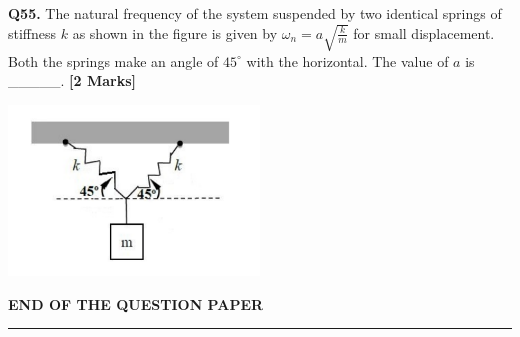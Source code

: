 \documentclass[11pt]{article}
\newcommand{\questionb}[2]{
    \noindent\textbf{Q#2.} #1 \hfill \textbf{[2 Marks]}
}
\begin{document}
\vspace{0.5cm}

\questionb{The natural frequency of the system suspended by two identical springs of stiffness $k$ as shown in the figure is given by $\omega_n = a \sqrt{\frac{k}{m}}$ for small displacement. Both the springs make an angle of $45^\circ$ with the horizontal. The value of $a$ is \_\_\_\_\_.}{55}
\begin{center}
\includegraphics[width=0.5\textwidth]{figures/55.png}
\end{center}

\vspace{5 cm}
\begin{center}
\textbf{END OF THE QUESTION PAPER}
	\rule{\textwidth}{0.5pt}
\end{center}
\end{document}
